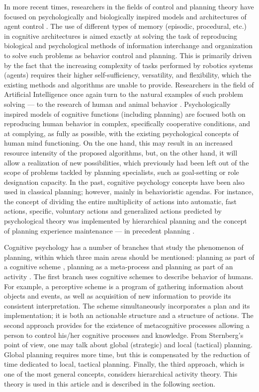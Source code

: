 \documentclass[review]{elsarticle}
\begin{document}
In more recent times, researchers in the fields of control and planning theory have focused on psychologically and biologically inspired models and architectures of agent control \cite{Kelley2006,Sun2012a}. The use of different types of memory (episodic, procedural, etc.) in cognitive architectures is aimed exactly at solving the task of reproducing biological and psychological methods of information interchange and organization to solve such problems as behavior control and planning. This is primarily driven by the fact that the increasing complexity of tasks performed by robotics systems (agents) requires their higher self-sufficiency, versatility, and flexibility, which the existing methods and algorithms are unable to provide. Researchers in the field of Artificial Intelligence once again turn to the natural examples of such problem solving --- to the research of human and animal behavior \cite{Redko2016,Panov2016b}. Psychologically inspired models of cognitive functions (including planning) are focused both on reproducing human behavior in complex, specifically cooperative conditions, and at complying, as fully as possible, with the existing psychological concepts of human mind functioning. On the one hand, this may result in an increased resource intensity of the proposed algorithms, but, on the other hand, it will allow a realization of new possibilities, which previously had been left out of the scope of problems tackled by planning specialists, such as goal-setting or role designation capacity. In the past, cognitive psychology concepts have been also used in classical planning; however, mainly in behavioristic agendas. For instance, the concept of dividing the entire multiplicity of actions into automatic, fast actions, specific, voluntary actions and generalized actions predicted by psychological theory \cite{Kahneman2011} was implemented by hierarchical planning and the concept of planning experience maintenance --- in precedent planning \cite{Hammond1990,DeLaRosa2013,Borrajo2015}.

Cognitive psychology has a number of branches that study the phenomenon of planning, within which three main areas should be mentioned: planning as part of a cognitive scheme \cite{Neisser1976}, planning as a meta-process \cite{Flavell1979,Sternberg2000} and planning as part of an activity \cite{Leontyev2009}. The first branch uses cognitive schemes to describe behavior of humans. For example, a perceptive scheme is a program of gathering information about objects and events, as well as acquisition of new information to provide its consistent interpretation. The scheme simultaneously incorporates a plan and its implementation; it is both an actionable structure and a structure of actions. The second approach provides for the existence of metacognitive processes allowing a person to control his/her cognitive processes and knowledge. From Sternberg's point of view, one may talk about global (strategic) and local (tactical) planning. Global planning requires more time, but this is compensated by the reduction of time dedicated to local, tactical planning. Finally, the third approach, which is one of the most general concepts, considers hierarchical activity theory. This theory is used in this article and is described in the following section. 
\end{document}
